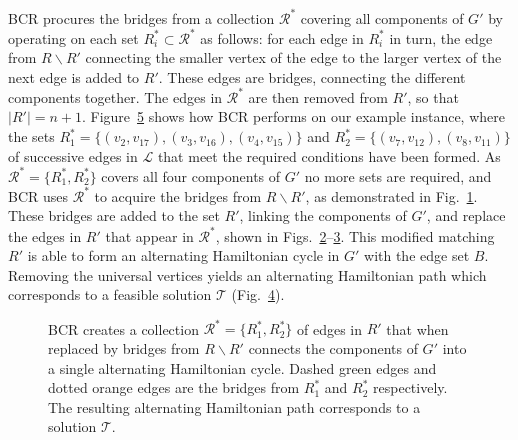 \documentclass[authoryear]{elsarticle}
\begin{document}
BCR procures the bridges from a collection $\mathcal{R}^*$ covering all components of $G'$ by operating on each set $R^*_i \subset \mathcal{R}^*$ as follows: for each edge in $R^*_i$ in turn, the edge from $R \backslash R'$ connecting the smaller vertex of the edge to the larger vertex of the next edge is added to $R'$. These edges are bridges, connecting the different components together. The edges in $\mathcal{R}^*$ are then removed from $R'$, so that $|R'| = n+1$. Figure~\ref{fig:bcr} shows how BCR performs on our example instance, where the sets $R^*_1 = \{(v_2, v_{17}),(v_3, v_{16}), (v_4, v_{15})\}$  and $R^*_2 = \{(v_7, v_{12}), (v_8, v_{11})\}$ of successive edges in $\mathcal{L}$ that meet the required conditions have been formed. As $\mathcal{R}^* =\{R^*_1, R^*_2\}$ covers all four components of $G'$ no more sets are required, and BCR uses $\mathcal{R}^*$ to acquire the bridges from $R\backslash R'$, as demonstrated in Fig.~\ref{fig:bcrlist}. These bridges are added to the set $R'$, linking the components of $G'$, and replace the edges in $R'$ that appear in $\mathcal{R}^*$, shown in Figs.~\ref{fig:mpsconnect}--\ref{fig:mpscycle}. This modified matching $R'$ is able to form an alternating Hamiltonian cycle in $G'$ with the edge set $B$. Removing the universal vertices yields an alternating Hamiltonian path which corresponds to a feasible solution $\mathcal{T}$ (Fig.~\ref{fig:solutionpath}).

\begin{figure}[H]	
	\centering
	\begin{subfigure}[h]{0.35\textwidth}
		
		\caption{}
		\label{fig:bcrlist}
	\end{subfigure} \hspace{7mm} %
	\begin{subfigure}[h]{0.25\textwidth}
		
		\caption{}
		\label{fig:mpsconnect}
	\end{subfigure} \hspace{7mm} %
	\begin{subfigure}[h]{0.25\textwidth}
		
		\caption{}
		\label{fig:mpscycle}
	\end{subfigure}
	\begin{subfigure}[h]{0.75\textwidth}
		
		\caption{}
		\label{fig:solutionpath}
	\end{subfigure}
	\caption{BCR creates a collection $\mathcal{R}^* = \{R^*_1, R^*_2\}$ of edges in $R'$ that when replaced by bridges from $R\backslash R'$ connects the components of $G'$ into a single alternating Hamiltonian cycle. Dashed green edges and dotted orange edges are the bridges from $R^*_1$ and $R^*_2$ respectively. The resulting alternating Hamiltonian path corresponds to a solution $\mathcal{T}$.}
	\label{fig:bcr}
\end{figure}
\end{document}

